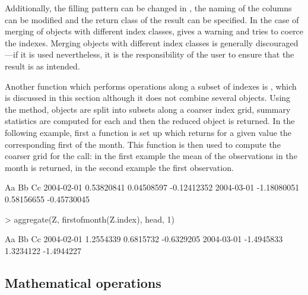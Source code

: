 \documentclass{Z}
\begin{document}
Additionally, the filling pattern can be changed in ,
the naming of the
columns can be modified and the return class of the result can
be specified. In the case of merging of objects with 
different index classes,  gives a warning and tries to
coerce the indexes. Merging objects with different index classes is
generally discouraged---if it is used nevertheless, it is the
responsibility of the user to ensure that the result is as intended.

Another function which performs operations along a subset of indexes
is , which is discussed in this section although
it does not combine several objects. Using the  method,  objects
are split into subsets along a coarser index grid,
summary statistics are computed for each and then the 
reduced object is returned. In the following example,
first a function is set up which returns for a given 
value the corresponding first of the month. This function is then
used to compute the coarser grid for the  call: in
the first example the mean of the observations in the month
is returned, in the second example the first observation.

\begin{Schunk}
\begin{Soutput}
           Aa          Bb          Cc         
2004-02-01  0.53820841  0.04508597 -0.12412352
2004-03-01 -1.18080051  0.58156655 -0.45730045
\end{Soutput}
\begin{Sinput}
> aggregate(Z, firstofmonth(Z.index), head, 1)
\end{Sinput}
\begin{Soutput}
           Aa         Bb         Cc        
2004-02-01  1.2554339  0.6815732 -0.6329205
2004-03-01 -1.4945833  1.3234122 -1.4944227
\end{Soutput}
\end{Schunk}


\subsection{Mathematical operations}
\label{sec:Ops}
\end{document}

